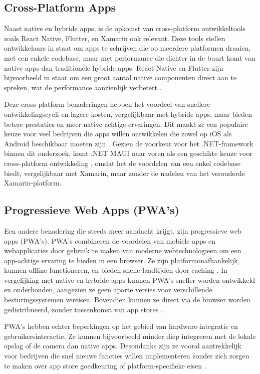 \subsection{Cross-Platform Apps} 
\noindent Naast native en hybride apps, is de opkomst van cross-platform ontwikkeltools zoals React Native, Flutter, en Xamarin ook relevant. Deze tools stellen ontwikkelaars in staat om apps te schrijven die op meerdere platformen draaien, met een enkele codebase, maar met performance die dichter in de buurt komt van native apps dan traditionele hybride apps. React Native en Flutter zijn bijvoorbeeld in staat om een groot aantal native componenten direct aan te spreken, wat de performance aanzienlijk verbetert \autocite{Soegaard2024}.

\noindent Deze cross-platform benaderingen hebben het voordeel van snellere ontwikkelingscycli en lagere kosten, vergelijkbaar met hybride apps, maar bieden betere prestaties en meer native-achtige ervaringen. Dit maakt ze een populaire keuze voor veel bedrijven die apps willen ontwikkelen die zowel op iOS als Android beschikbaar moeten zijn \autocite{Amazon}. Gezien de voorkeur voor het .NET-framework binnen dit onderzoek, komt .NET MAUI naar voren als een geschikte keuze voor cross-platform ontwikkeling \autocite{Dijk2022}, omdat het de voordelen van een enkel codebase biedt, vergelijkbaar met Xamarin, maar zonder de nadelen van het verouderde Xamarin-platform.

\subsection{Progressieve Web Apps (PWA’s)} 
\noindent Een andere benadering die steeds meer aandacht krijgt, zijn progressieve web apps (PWA's). PWA's combineren de voordelen van mobiele apps en webapplicaties door gebruik te maken van moderne webtechnologieën om een app-achtige ervaring te bieden in een browser. Ze zijn platformonafhankelijk, kunnen offline functioneren, en bieden snelle laadtijden door caching \autocite{Fortunato2018}. In vergelijking met native en hybride apps kunnen PWA's sneller worden ontwikkeld en onderhouden, aangezien ze geen aparte versies voor verschillende besturingssystemen vereisen. Bovendien kunnen ze direct via de browser worden gedistribueerd, zonder tussenkomst van app stores \autocite{BioernHansen2018}.

\noindent PWA’s hebben echter beperkingen op het gebied van hardware-integratie en gebruikersinteractie. Ze kunnen bijvoorbeeld minder diep integreren met de lokale opslag of de camera dan native apps. Desondanks zijn ze vooral aantrekkelijk voor bedrijven die snel nieuwe functies willen implementeren zonder zich zorgen te maken over app store goedkeuring of platform-specifieke eisen \autocite{Mozilla}.

